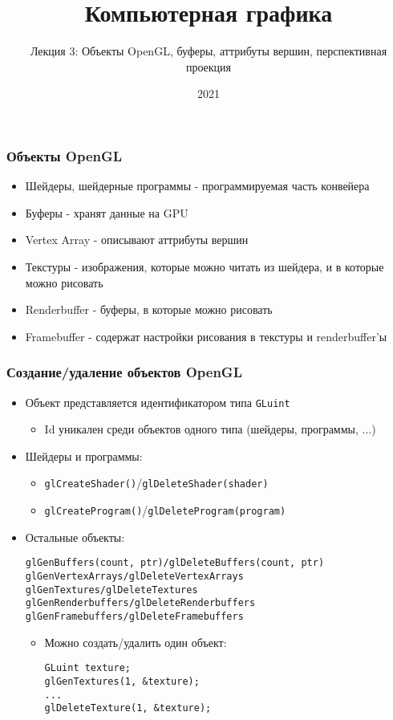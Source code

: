 \documentclass{beamer}
\title{Компьютерная графика}
\subtitle{Лекция 3: Объекты OpenGL, буферы, аттрибуты вершин, перспективная проекция}
\date{2021}
\begin{document}
\frame{\titlepage}

\begin{frame}[fragile]
\frametitle{Объекты OpenGL}
\begin{itemize}
\item Шейдеры, шейдерные программы - программируемая часть конвейера
\pause
\item Буферы - хранят данные на GPU
\pause
\item Vertex Array - описывают аттрибуты вершин
\pause
\item Текстуры - изображения, которые можно читать из шейдера, и в которые можно рисовать
\pause
\item Renderbuffer - буферы, в которые можно рисовать
\pause
\item Framebuffer - содержат настройки рисования в текстуры и renderbuffer'ы
\end{itemize}
\end{frame}

\begin{frame}[fragile]
\frametitle{Создание/удаление объектов OpenGL}
\begin{itemize}
\item Объект представляется идентификатором типа \verb|GLuint|
\begin{itemize}
\item Id уникален среди объектов одного типа (шейдеры, программы, ...)
\end{itemize}
\pause
\item Шейдеры и программы:
\begin{itemize}
\item \verb|glCreateShader()|/\verb|glDeleteShader(shader)|
\item \verb|glCreateProgram()|/\verb|glDeleteProgram(program)|
\end{itemize}
\pause
\item Остальные объекты:
\begin{verbatim}
glGenBuffers(count, ptr)/glDeleteBuffers(count, ptr)
glGenVertexArrays/glDeleteVertexArrays
glGenTextures/glDeleteTextures
glGenRenderbuffers/glDeleteRenderbuffers
glGenFramebuffers/glDeleteFramebuffers
\end{verbatim}
\pause
\begin{itemize}
\item Можно создать/удалить один объект:
\begin{verbatim}
GLuint texture;
glGenTextures(1, &texture);
...
glDeleteTexture(1, &texture);
\end{verbatim}
\end{itemize}
\end{itemize}
\end{frame}
\end{document}
